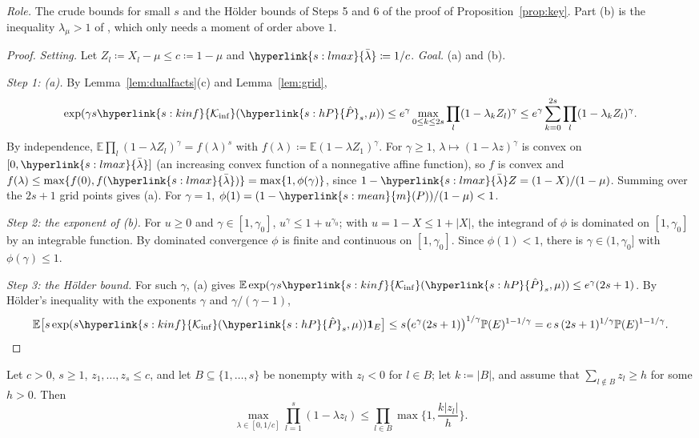 \documentclass[11pt]{article}
\newcommand{\E}{\mathbb{E}}
\newcommand{\Prob}{\mathbb{P}}
\newcommand{\ind}{\mathbf{1}}
\newcommand{\sy}[2]{{\hyperlink{#1}{#2}}}
\newcommand{\mean}{\sy{s:mean}{m}}
\newcommand{\Kinf}{\sy{s:kinf}{\mathcal{K}_{\inf}}}
\newcommand{\hP}{\sy{s:hP}{\hat{P}}}
\newcommand{\lmax}{\sy{s:lmax}{\bar{\lambda}}}
\begin{document}
\emph{Role.} The crude bounds for small $s$ and the H\"older bounds of Steps 5 and 6 of the proof of
Proposition~\ref{prop:key}. Part (b) is the inequality $\lambda_\mu>1$ of
\citet[Proposition~11(i)]{HT15}, which only needs a moment of order above $1$.

\begin{proof}
\emph{Setting.} Let $Z_l\coloneqq X_l-\mu\le c\coloneqq1-\mu$ and $\lmax\coloneqq1/c$.
\emph{Goal.} (a) and (b).

\emph{Step 1: (a).} By Lemma~\ref{lem:dualfacts}(c) and Lemma~\ref{lem:grid},
\[
  \exp(\gamma s\Kinf(\hP_s,\mu))\le e^\gamma\max_{0\le k\le2s}\prod_l(1-\lambda_kZ_l)^\gamma\le
  e^\gamma\sum_{k=0}^{2s}\prod_l(1-\lambda_kZ_l)^\gamma.
\]
By independence, $\E\prod_l(1-\lambda Z_l)^\gamma=f(\lambda)^s$ with
$f(\lambda)\coloneqq\E(1-\lambda Z_1)^\gamma$. For $\gamma\ge1$, $\lambda\mapsto(1-\lambda z)^\gamma$ is
convex on $[0,\lmax]$ (an increasing convex function of a nonnegative affine function), so $f$ is
convex and $f(\lambda)\le\max\{f(0),f(\lmax)\}=\max\{1,\phi(\gamma)\}$, since
$1-\lmax Z=(1-X)/(1-\mu)$. Summing over the $2s+1$ grid points gives (a). For $\gamma=1$,
$\phi(1)=(1-\mean(P))/(1-\mu)<1$.

\emph{Step 2: the exponent of (b).} For $u\ge0$ and $\gamma\in[1,\gamma_0]$,
$u^\gamma\le1+u^{\gamma_0}$; with $u=1-X\le1+|X|$, the integrand of $\phi$ is dominated on
$[1,\gamma_0]$ by an integrable function. By dominated convergence $\phi$ is finite and continuous on
$[1,\gamma_0]$. Since $\phi(1)<1$, there is $\gamma\in(1,\gamma_0]$ with $\phi(\gamma)\le1$.

\emph{Step 3: the H\"older bound.} For such $\gamma$, (a) gives $\E\exp(\gamma s\Kinf(\hP_s,\mu))\le e^\gamma(2s+1)$.
By H\"older's inequality with the exponents $\gamma$ and $\gamma/(\gamma-1)$,
\[
  \E\big[s\exp(s\Kinf(\hP_s,\mu))\ind_E\big]\le s\big(e^\gamma(2s+1)\big)^{1/\gamma}\Prob(E)^{1-1/\gamma}
  =e\,s\,(2s+1)^{1/\gamma}\Prob(E)^{1-1/\gamma}.
\]
\end{proof}

\begin{lemma}\label{lem:goodpart}
Let $c>0$, $s\ge1$, $z_1,\dots,z_s\le c$, and let $B\subseteq\{1,\dots,s\}$ be nonempty with
$z_l<0$ for $l\in B$; let $k\coloneqq|B|$, and assume that $\sum_{l\notin B}z_l\ge h$ for some
$h>0$. Then
\[
  \max_{\lambda\in[0,1/c]}\prod_{l=1}^s(1-\lambda z_l)\le\prod_{l\in B}\max\Big\{1,\frac{k|z_l|}{h}\Big\}.
\]
\end{lemma}
\end{document}
